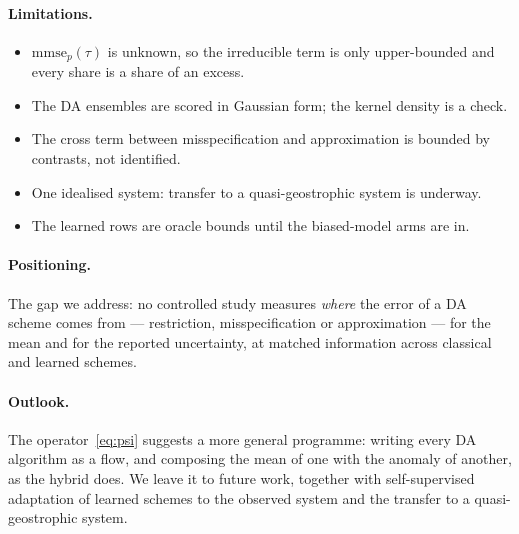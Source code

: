\paragraph{Limitations.}
\begin{itemize}[leftmargin=*,nosep]
  \item $\mathrm{mmse}_p(\tau)$ is unknown, so the irreducible term is only
    upper-bounded and every share is a share of an excess.
  \item The DA ensembles are scored in Gaussian form; the kernel density is a
    check.
  \item The cross term between misspecification and approximation is bounded by
    contrasts, not identified.
  \item One idealised system: transfer to a quasi-geostrophic system is
    underway.
  \item The learned \So{} rows are oracle bounds until the biased-model arms are
    in.
\end{itemize}

\paragraph{Positioning.}
 The gap we address: no controlled study measures \emph{where} the
error of a DA scheme comes from --- restriction, misspecification or
approximation --- for the mean and for the reported uncertainty, at matched
information across classical and learned schemes.

\paragraph{Outlook.}
The operator~\eqref{eq:psi} suggests a more general programme: writing every DA
algorithm as a flow, and composing the mean of one with the anomaly of another,
as the hybrid does. We leave it to future work, together with self-supervised
adaptation of learned schemes to the observed system and the transfer to a
quasi-geostrophic system.

